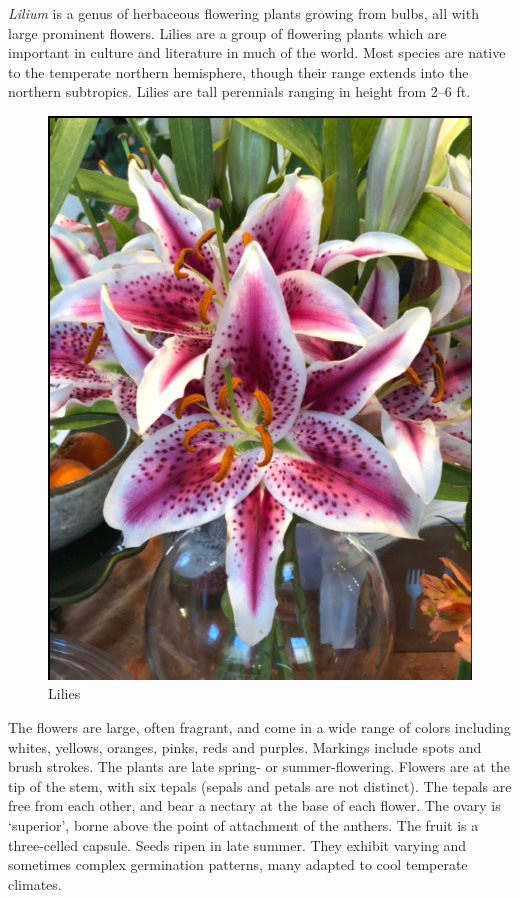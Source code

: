\emph{Lilium} is a genus of herbaceous flowering plants growing from
bulbs, all with large prominent flowers. Lilies are a group of flowering
plants which are important in culture and literature in much of the
world. Most species are native to the temperate northern hemisphere,
though their range extends into the northern subtropics. Lilies are
tall perennials ranging in height from 2--6 ft.

\begin{figure}

{\centering \includegraphics[width=0.7\linewidth]{./figures/gymnosperms/lily}

}

\caption{Lilies}\label{fig:Lilies}
\end{figure}

The flowers are large, often fragrant, and come in a wide range of
colors including whites, yellows, oranges, pinks, reds and purples.
Markings include spots and brush strokes. The plants are late spring- or
summer-flowering. Flowers are at the tip of the stem, with six tepals
(sepals and petals are not distinct). The tepals are free from each
other, and bear a nectary at the base of each flower. The ovary is
`superior', borne above the point of attachment of the anthers. The
fruit is a three-celled capsule. Seeds ripen in late summer. They
exhibit varying and sometimes complex germination patterns, many adapted
to cool temperate climates. 

